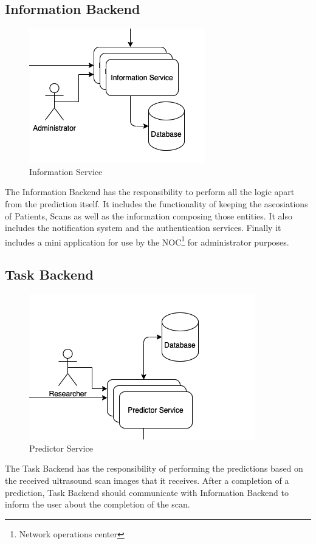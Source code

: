 		\subsection{Information Backend}
			\begin{figure}[H]
				\iftrue
				\caption{Information Service}
				\centering
				\includegraphics[scale=0.3]{figures/infobe}
				\fi
			\end{figure}
			The Information Backend has the responsibility to perform all the logic apart from the prediction itself. It includes the 
			functionality of keeping the ascosiations of Patients, Scans as well as the information composing those entities. It also includes 
			the notification system and the authentication services. Finally it includes a mini application for use by the NOC\footnote{Network operations center} 
			for administrator purposes.
		\subsection{Task Backend}
			\begin{figure}[H]
				\iftrue
				\caption{Predictor Service}
				\centering
				\includegraphics[scale=0.3]{figures/taskbe}
				\fi
			\end{figure}
			The Task Backend has the responsibility of performing the predictions based on the received ultrasound scan images that it receives.
			After a completion of a prediction, Task Backend should communicate with Information Backend to inform the user about the completion 
			of the scan.
